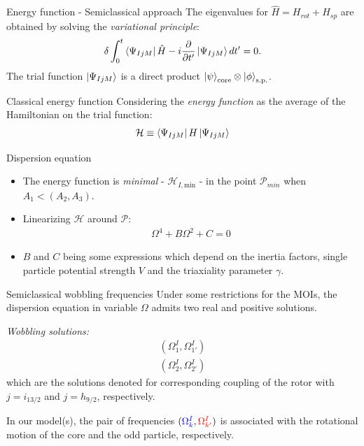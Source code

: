 \documentclass{beamer}
\begin{document}
\begin{frame}{Energy function - Semiclassical approach}
      The eigenvalues for $\hat{H}=H_{rot}+H_{sp}$ are obtained by solving the \emph{variational principle}:
  \begin{align}
    \delta \int_0^t\bra{\Psi_{IjM}}\hat{H}-i\frac{\partial}{\partial t'}\ket{\Psi_{IjM}}dt'=0.
  \end{align}
  The trial function $\ket{\Psi_{IjM}}$ is a direct product $\ket{\psi}_\text{core}\otimes\ket{\phi}_\text{s.p.}$.
\end{frame}


\begin{frame}{Classical energy function}
Considering the \emph{energy function} as the average of the Hamiltonian on the trial function:
  \begin{align}
    \mathcal{H}\equiv\bra{\Psi_{IjM}}H\ket{\Psi_{IjM}}
  \end{align}
  \begin{block}{Dispersion equation}
  \begin{itemize}
      \item The energy function is \emph{minimal} - $\mathcal{H}_{I,\text{min}}$ - in the point $\mathcal{P}_{min}$ when $A_1<(A_2,A_3)$.
      \item Linearizing $\mathcal{H}$ around $\mathcal{P}$:
  \begin{align}
    \Omega^4+B\Omega^2+C=0
  \end{align}
  \item $B$ and $C$ being some expressions which depend on the inertia factors, single particle potential strength $V$ and the triaxiality parameter $\gamma$.
  \end{itemize}  
  \end{block}
\end{frame}

\begin{frame}{Semiclassical wobbling frequencies}
  Under some restrictions for the MOIs, the dispersion equation in variable $\Omega$ admits two real and positive solutions.\\
  \par \emph{Wobbling solutions:}
  \begin{align}
    (\Omega_1^I,\Omega_{1'}^I)\\
    (\Omega_2^I,\Omega_{2'}^I)
  \end{align}
  which are the solutions denoted for corresponding coupling of the rotor with $j=i_{13/2}$ and $j=h_{9/2}$, respectively.
  \par In our model(s), the pair of frequencies $({\color{blue}\Omega_k^I},{\color{red}\Omega_{k'}^I})$ is associated with the rotational motion of the {\color{blue}core} and the {\color{red}odd particle}, respectively.
\end{frame}
\end{document}
